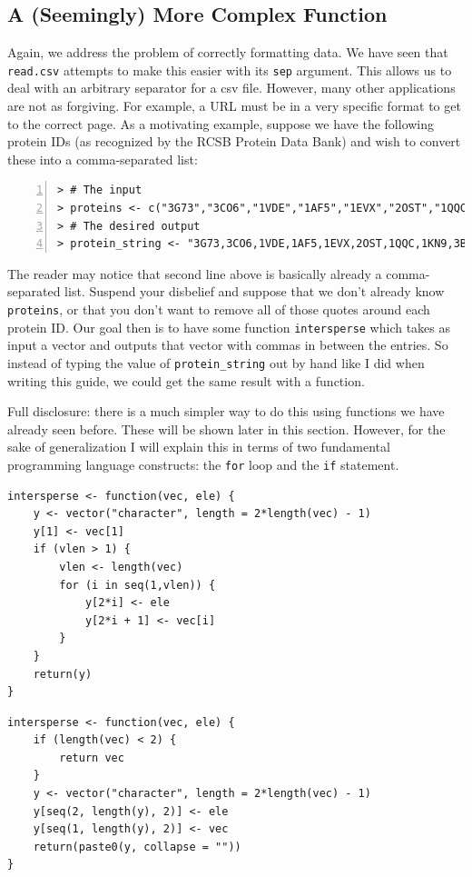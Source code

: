 \documentclass[12pt]{article}
\theoremstyle{remark}
\begin{document}
\subsection{A (Seemingly) More Complex Function}
Again, we address the problem of correctly formatting data. We have seen that \verb|read.csv| attempts to make this easier with its \verb|sep| argument. This allows us to deal with an arbitrary separator for a csv file. However, many other applications are not as forgiving. For example, a URL must be in a very specific format to get to the correct page. As a motivating example, suppose we have the following protein IDs (as recognized by the RCSB Protein Data Bank) and wish to convert these into a comma-separated list:

\begin{Verbatim}[frame=single, fontsize=\small, numbers=left]
> # The input
> proteins <- c("3G73","3CO6","1VDE","1AF5","1EVX","2OST","1QQC","1KN9","3BF0")
> # The desired output
> protein_string <- "3G73,3CO6,1VDE,1AF5,1EVX,2OST,1QQC,1KN9,3BF0"
\end{Verbatim}

The reader may notice that second line above is basically already a comma-separated list. Suspend your disbelief and suppose that we don't already know \verb|proteins|, or that you don't want to remove all of those quotes around each protein ID. Our goal then is to have some function \verb|intersperse| which takes as input a vector and outputs that vector with commas in between the entries. So instead of typing the value of \verb|protein_string| out by hand like I did when writing this guide, we could get the same result with a function.

Full disclosure: there is a much simpler way to do this using functions we have already seen before. These will be shown later in this section. However, for the sake of generalization I will explain this in terms of two fundamental programming language constructs: the \verb|for| loop and the \verb|if| statement.

\begin{Verbatim}[frame=single, fontsize=\small]
intersperse <- function(vec, ele) {
	y <- vector("character", length = 2*length(vec) - 1)
	y[1] <- vec[1]
	if (vlen > 1) {
		vlen <- length(vec)
		for (i in seq(1,vlen)) {
			y[2*i] <- ele
			y[2*i + 1] <- vec[i]
		}
	}
	return(y)
}
\end{Verbatim}


\begin{Verbatim}[frame=single, fontsize=\small]
intersperse <- function(vec, ele) {
	if (length(vec) < 2) {
		return vec
	}
	y <- vector("character", length = 2*length(vec) - 1)
	y[seq(2, length(y), 2)] <- ele
	y[seq(1, length(y), 2)] <- vec
	return(paste0(y, collapse = ""))
}
\end{Verbatim}
\end{document}
